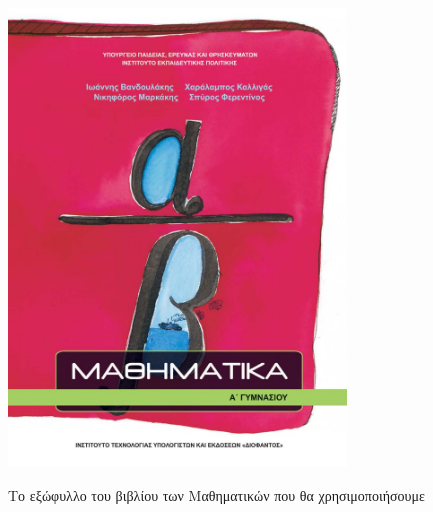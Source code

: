 \begin{figure}
\centering
\includegraphics[width=0.8\textwidth]{matha.jpg}
\label{matha}
\caption{Το εξώφυλλο του βιβλίου των Μαθηματικών που θα χρησιμοποιήσουμε}
\end{figure}
